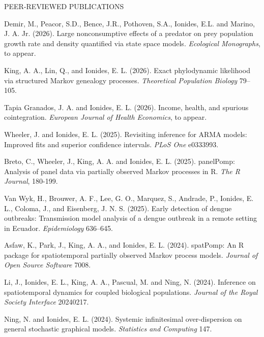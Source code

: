 \begin{reflist}{PEER-REVIEWED PUBLICATIONS}

\item Demir, M., Peacor, S.D., Bence,  J.R.,  Pothoven, S.A., Ionides, E.L. and Marino,  J. A. Jr.  (2026). Large nonconsumptive effects of a predator on prey population growth
rate and density quantified via state space models. {\it Ecological Monographs}, to appear.
  
\item  King, A. A., Lin, Q., and Ionides, E. L. (2026).  Exact phylodynamic likelihood via structured Markov genealogy processes. {\it Theoretical Population Biology} {}{\separator}79--105.

\item Tapia Granados, J. A. and Ionides, E. L. (2026). Income, health, and spurious cointegration. {\it European Journal of Health Economics}, to appear.
  
\item Wheeler, J. and Ionides, E. L. (2025). Revisiting inference for ARMA models: Improved fits and superior confidence intervals. {\it PLoS One} {}{\separator}e0333993.

\item Breto, C., Wheeler, J., King, A. A. and Ionides, E. L. (2025). panelPomp: Analysis of panel data via partially observed Markov processes in R. {\it The R Journal}, {}{\separator}180-199.

\item Van Wyk, H.,  Brouwer, A. F.,  Lee, G. O., Marquez, S., Andrade, P.,  Ionides, E. L., Coloma, J., and Eisenberg, J. N. S. (2025). Early detection of dengue outbreaks: Transmission model analysis of a dengue outbreak in a remote setting in Ecuador. {\it Epidemiology} {}{\separator}636--645.

\item Asfaw, K., Park, J., King, A. A., and Ionides, E. L. (2024). spatPomp: An R package for spatiotemporal partially observed Markov process models. {\it Journal of Open Source Software} {}{\separator}7008.
  
\item Li, J., Ionides, E. L., King, A. A., Pascual, M. and Ning, N. (2024). Inference on spatiotemporal dynamics for coupled biological populations. {\it Journal of the Royal Society Interface} {}{\separator}20240217.
  
\item Ning, N. and Ionides, E. L. (2024). Systemic infinitesimal over-dispersion on general stochastic graphical models. {\it Statistics and Computing} {}{\separator}147.


\end{reflist}

